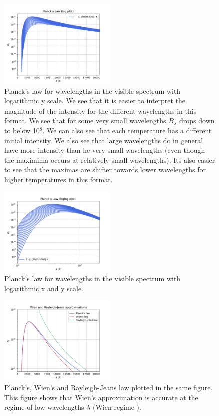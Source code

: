 \documentclass[a4paper,11.5pt,]{article}
\begin{document}
\begin{multicols}{2}
\begin{figure}[H]
	\centering
	\includegraphics[width=0.5\textwidth]{SSA/figures/plancklog.pdf}
	\caption{Planck's law for wavelengths in the visible spectrum with logarithmic y scale. We see that it is easier to interpret the magnitude of the intensity for the different wavelengths in this format. We see that for some very small wavelengths $B_\lambda$ drops down to below 10$^8$. We can also see that each temperature has a different initial intensity. We also see that large wavelengths do in general have more intensity than he very small wavelengths (even though the maximima occurs at relatively small wavelengths). Its also easier to see that the maximas are shifter towards lower wavelengths for higher temperatures in this format.}
	\label{fig:13}
\end{figure}


\begin{figure}[H]
	\centering
	\includegraphics[width=0.5\textwidth]{SSA/figures/planckloglog.pdf}
	\caption{Planck's law for wavelengths in the visible spectrum with logarithmic x and y scale.}
	\label{fig:14}
\end{figure}
 
\begin{figure}[H]
	\centering
	\includegraphics[width=0.5\textwidth]{SSA/figures/planckapprox.pdf}
	\caption{Planck's, Wien's and Rayleigh-Jeans law plotted in the same figure. This figure shows that Wien's approximation is accurate at the regime of low wavelengths $\lambda$ (Wien regime ).}
	\label{fig:15}
\end{figure}


\end{multicols}
\end{document}
